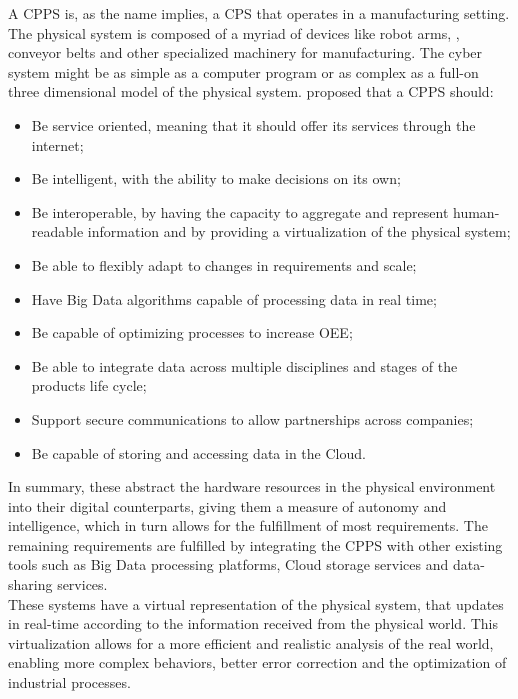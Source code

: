 A \acrlong{CPPS} is, as the name implies, a \acrlong{CPS} that operates in a manufacturing setting. The physical system is composed of a myriad of devices like robot arms, , conveyor belts and other specialized machinery for manufacturing. The cyber system might be as simple as a computer program or as complex as a full-on three dimensional model of the physical system. \citeauthor{birgit01} \cite{birgit01} proposed that a \acrshort{CPPS} should:
\begin{itemize}
	\item Be service oriented, meaning that it should offer its services through the internet;
	\item Be intelligent, with the ability to make decisions on its own;
	\item Be interoperable, by having the capacity to aggregate and represent human-readable information and by providing a virtualization of the physical system;
	\item Be able to flexibly adapt to changes in requirements and scale;
	\item Have Big Data algorithms capable of processing data in real time;
	\item Be capable of optimizing processes to increase \acrfull{OEE};
	\item Be able to integrate data across multiple disciplines and stages of the products life cycle;
	\item Support secure communications to allow partnerships across companies;
	\item Be capable of storing and accessing data in the Cloud.
\end{itemize}

In summary, these  abstract the hardware resources in the physical environment into their digital counterparts, giving them a measure of autonomy and intelligence, which in turn allows for the fulfillment of most requirements. The remaining requirements are fulfilled by integrating the \acrshort{CPPS} with other existing tools such as Big Data processing platforms, Cloud storage services and data-sharing services. \\

These systems have a virtual representation of the physical system, that updates in real-time according to the information received from the physical world. This virtualization allows for a more efficient and realistic analysis of the real world, enabling more complex behaviors, better error correction and the optimization of industrial processes.\\

